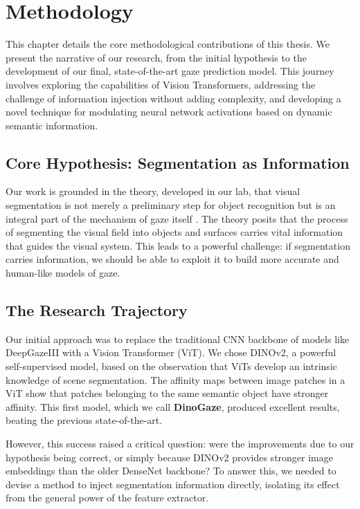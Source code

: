\chapter{Methodology}
\label{cha:methodology}

This chapter details the core methodological contributions of this thesis. We present the narrative of our research, from the initial hypothesis to the development of our final, state-of-the-art gaze prediction model. This journey involves exploring the capabilities of Vision Transformers, addressing the challenge of information injection without adding complexity, and developing a novel technique for modulating neural network activations based on dynamic semantic information.

\section{Core Hypothesis: Segmentation as Information}
\label{sec:method_hypothesis}

Our work is grounded in the theory, developed in our lab, that visual segmentation is not merely a preliminary step for object recognition but is an integral part of the mechanism of gaze itself \cite{vacher2023measuring}. The theory posits that the process of segmenting the visual field into objects and surfaces carries vital information that guides the visual system. This leads to a powerful challenge: if segmentation carries information, we should be able to exploit it to build more accurate and human-like models of gaze.

\section{The Research Trajectory}
\label{sec:method_trajectory}

Our initial approach was to replace the traditional CNN backbone of models like DeepGazeIII with a Vision Transformer (ViT). We chose DINOv2, a powerful self-supervised model, based on the observation that ViTs develop an intrinsic knowledge of scene segmentation. The affinity maps between image patches in a ViT show that patches belonging to the same semantic object have stronger affinity. This first model, which we call \textbf{DinoGaze}, produced excellent results, beating the previous state-of-the-art.

However, this success raised a critical question: were the improvements due to our hypothesis being correct, or simply because DINOv2 provides stronger image embeddings than the older DenseNet backbone? To answer this, we needed to devise a method to inject segmentation information directly, isolating its effect from the general power of the feature extractor.

